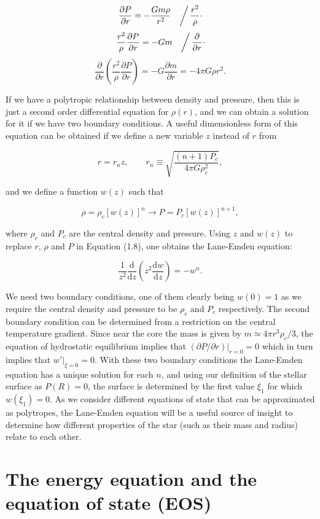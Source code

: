 \documentclass[twocolumn]{article}
\begin{document}
\[\left.\frac{\partial P}{\partial r}=-\frac{Gm\rho}{r^2}\quad\right/ \frac{r^2}{\rho}\cdot\]
\[\left.\frac{r^2}{\rho}\frac{\partial P}{\partial r}=-Gm\quad\right/ \frac{\partial}{\partial r}\cdot\]
\[\frac{\partial}{\partial r}\left(\frac{r^2}{\rho}\frac{\partial P}{\partial r}\right)=-G\frac{\partial m}{\partial r}=-4\pi G \rho r^2.\tag{1.8}\]

If we have a polytropic relationship between density and pressure, then
this is just a second order differential equation for \(\rho(r)\), and
we can obtain a solution for it if we have two boundary conditions. A
useful dimensionless form of this equation can be obtained if we define
a new variable \(z\) instead of \(r\) from

\[r=r_n z,\qquad r_n \equiv \sqrt{\frac{(n+1)P_c}{4\pi G\rho_c^2}},\]

and we define a function \(w(z)\) such that

\[\rho = \rho_c \left[w(z)\right]^n\rightarrow P=P_c\left[w(z)\right]^{n+1},\]

where \(\rho_c\) and \(P_c\) are the central density and pressure. Using
\(z\) and \(w(z)\) to replace \(r\), \(\rho\) and \(P\) in Equation
(1.8), one obtains the Lane-Emden equation:

\[\frac{1}{z^2}\frac{\mathrm{d}}{\mathrm{d} z}\left(z^2\frac{\mathrm{d}w}{\mathrm{d}z}\right)=-w^n.\]

We need two boundary conditions, one of them clearly being \(w(0)=1\) as
we require the central density and pressure to be \(\rho_c\) and \(P_c\)
respectively. The second boundary condition can be determined from a
restriction on the central temperature gradient. Since near the core the
mass is given by \(m\simeq 4\pi r^3 \rho_c/3\), the equation of
hydrostatic equilibrium implies that
\((\partial P/\partial r)|_{r=0}=0\) which in turn implies that
\(w'|_{\xi=0}=0\). With these two boundary conditions the Lane-Emden
equation has a unique solution for each \(n\), and using our definition
of the stellar surface as \(P(R)=0\), the surface is determined by the
first value \(\xi_1\) for which \(w(\xi_1)=0\). As we consider different
equations of state that can be approximated as polytropes, the
Lane-Emden equation will be a useful source of insight to determine how
different properties of the star (such as their mass and radius) relate
to each other.

\hypertarget{the-energy-equation-and-the-equation-of-state-eos}{%
\section{The energy equation and the equation of state
(EOS)}\label{the-energy-equation-and-the-equation-of-state-eos}}
\end{document}
